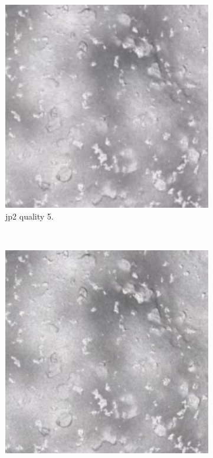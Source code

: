 \begin{figure}[htb]
\begin{subfigure}[b]{0.44\textwidth}
            \includegraphics[width=\textwidth]{doc/thesis/0_figures/compare_quality/set1/center/jp2_5_center.png}
            \caption{\gls{jp2} quality 5.}
            \label{fig:img_quality_5}
        \end{subfigure}
        \\
        \begin{subfigure}[b]{0.44\textwidth}
            \centering
            \includegraphics[width=\textwidth]{doc/thesis/0_figures/compare_quality/set1/center/jp2_10_center.png}

\end{subfigure}
\end{figure}
